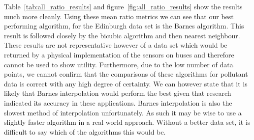 
		Table~\ref{tab:all_ratio_results} and figure~\ref{fig:all_ratio_results} show the results much more cleanly. Using these mean ratio metrics we can see that our best performing algorithm, for the Edinburgh data set is the Barnes algorithm. This result is followed closely by the bicubic algorithm and then nearest neighbour. These results are not representative however of a data set which would be returned  by a physical implementation of the sensors on buses and therefore cannot be used to show utility. Furthermore, due to the low number of data points, we cannot confirm that the comparisons of these algorithms for pollutant data is correct with any high degree of certainty. We can however state that it is likely that Barnes interpolation would perform the best given that research indicated its accuracy in these applications. Barnes interpolation is also the slowest method of interpolation unfortunately. As such it may be wise to use a slightly faster algorithm in a real world approach. Without a better data set, it is difficult to say which of the algorithms this would be. 

